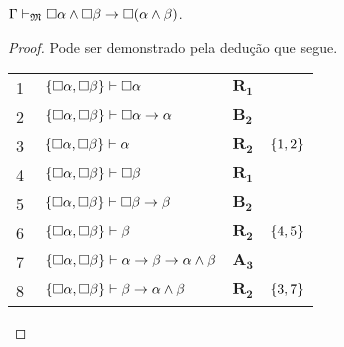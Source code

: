 \vspace{.5\baselineskip}
\begin{tcolorbox}[enhanced jigsaw, breakable, sharp corners, colframe=black, colback=white, boxrule=0.5pt, left=1.5mm, right=1.5mm, top=1.5mm, bottom=1.5mm]
    \begin{lemma}\label{necessity.conjunction.undistribution}
        $\Gamma\mathrel{\vdash}_\mathfrak{M}\Box\alpha\wedge\Box\beta\to\Box(\alpha\wedge\beta)$.
        \begin{proof}
        Pode ser demonstrado pela dedução que segue.

        \vspace{0.5\baselineskip}
        \footnotesize
        \setlength{\rowskip}{0.5\baselineskip}
        \begin{xltabular}{\textwidth}{r | X l l}
            \scriptsize{\phantom{0}1}\phantom{ } & $\ \set{\nec\alpha,\nec\beta}\vdash\nec\alpha$                         & $\hyperref[modal.rule.1]{\mathbf{R_1}}$        & \\[\rowskip]
            \scriptsize{\phantom{0}2}\phantom{ } & $\ \set{\nec\alpha,\nec\beta}\vdash\nec\alpha\to\alpha$                & $\hyperref[modal.axiom.modal.2]{\mathbf{B_2}}$ & \\[\rowskip]
            \scriptsize{\phantom{0}3}\phantom{ } & $\ \set{\nec\alpha,\nec\beta}\vdash\alpha$                             & $\hyperref[modal.rule.2]{\mathbf{R_2}}$        & $\left\{1,2\right\}$\\[\rowskip]
            \scriptsize{\phantom{0}4}\phantom{ } & $\ \set{\nec\alpha,\nec\beta}\vdash\nec\beta$                          & $\hyperref[modal.rule.1]{\mathbf{R_1}}$        & \\[\rowskip]
            \scriptsize{\phantom{0}5}\phantom{ } & $\ \set{\nec\alpha,\nec\beta}\vdash\nec\beta\to\beta$                  & $\hyperref[modal.axiom.modal.2]{\mathbf{B_2}}$ & \\[\rowskip]
            \scriptsize{\phantom{0}6}\phantom{ } & $\ \set{\nec\alpha,\nec\beta}\vdash\beta$                              & $\hyperref[modal.rule.2]{\mathbf{R_2}}$        & $\left\{4,5\right\}$\\[\rowskip]
            \scriptsize{\phantom{0}7}\phantom{ } & $\ \set{\nec\alpha,\nec\beta}\vdash\alpha\to\beta\to\alpha\wedge\beta$ & $\hyperref[modal.axiom.3]{\mathbf{A_3}}$       & \\[\rowskip]
            \scriptsize{\phantom{0}8}\phantom{ } & $\ \set{\nec\alpha,\nec\beta}\vdash\beta\to\alpha\wedge\beta$          & $\hyperref[modal.rule.2]{\mathbf{R_2}}$        & $\left\{3,7\right\}$\\[\rowskip]

\end{xltabular}
\end{proof}
\end{lemma}
\end{tcolorbox}
